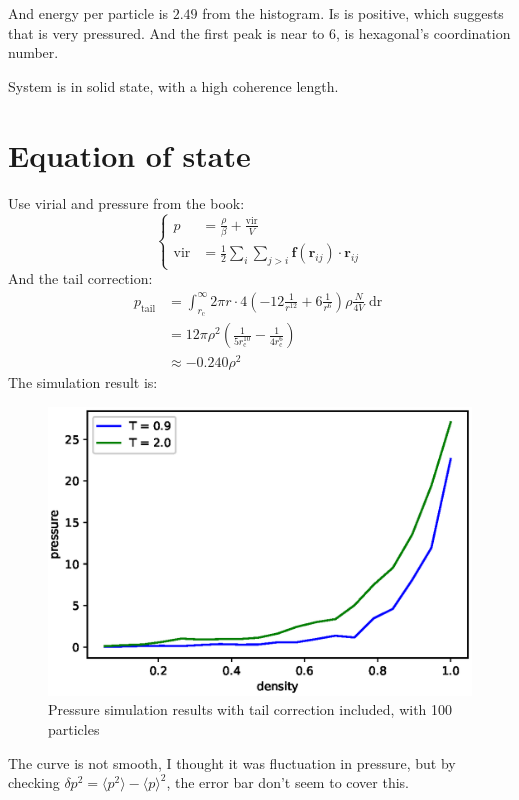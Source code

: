 \documentclass[UTF8,a4paper]{article}
\begin{document}
And energy per particle is $2.49$ from the histogram. Is is positive, which suggests that is very pressured. And the first peak is near to 6, is hexagonal's coordination number.

System is in solid state, with a high coherence length.
\section{Equation of state}
Use virial and pressure from the book:
\begin{equation}
	\left\{
	\begin{aligned}
		p          & =\frac{\rho}{\beta}+\frac{\text{vir}}{V}                                                        \\
		\text{vir} & =\frac{1}{2} \sum_{i} \sum_{j>i} \mathbf{f}\left(\mathbf{r}_{i j}\right) \cdot \mathbf{r}_{i j}
	\end{aligned}
	\right.
\end{equation}
And the tail correction:
\begin{align}
	p_{\text{tail}} & = \int_{r_\text{c}}^\infty 2\pi r \cdot 4\left(-12\frac{1}{r^{12}} + 6\frac{1}{r^6}\right) \rho\frac{N}{4V} \operatorname{dr} \\
	                & = 12\pi\rho^2\left(\frac{1}{5r_\text{c}^{10}} - \frac{1}{4r_\text{c}^6}\right)                                                \\
	                & \approx -0.240\rho^2
\end{align}
The simulation result is:
\begin{figure}[h]
	\centering
	\includegraphics[height=0.2\textheight]{fig/pressure.eps}
	\caption{Pressure simulation results with tail correction included, with 100 particles}
	\label{fig:pressure-1}
\end{figure}
The curve is not smooth, I thought it was fluctuation in pressure, but by checking $\delta p^2 = \langle p^2\rangle - \langle p\rangle^2$, the error bar don't seem to cover this.
\end{document}
